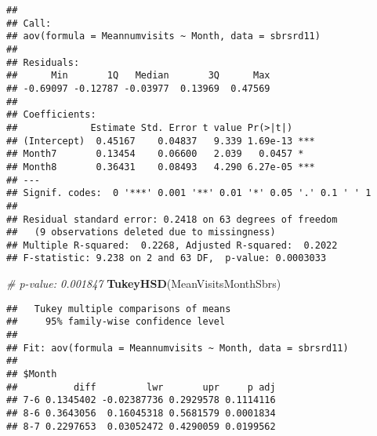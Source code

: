 \documentclass[]{article}
\newenvironment{Shaded}{\begin{snugshade}}{\end{snugshade}}
\newcommand{\CommentTok}[1]{\textcolor[rgb]{0.56,0.35,0.01}{\textit{#1}}}
\newcommand{\KeywordTok}[1]{\textcolor[rgb]{0.13,0.29,0.53}{\textbf{#1}}}
\newcommand{\NormalTok}[1]{#1}
\newcommand{\OperatorTok}[1]{\textcolor[rgb]{0.81,0.36,0.00}{\textbf{#1}}}
\newcommand{\StringTok}[1]{\textcolor[rgb]{0.31,0.60,0.02}{#1}}
\begin{document}
\begin{verbatim}
## 
## Call:
## aov(formula = Meannumvisits ~ Month, data = sbrsrd11)
## 
## Residuals:
##      Min       1Q   Median       3Q      Max 
## -0.69097 -0.12787 -0.03977  0.13969  0.47569 
## 
## Coefficients:
##             Estimate Std. Error t value Pr(>|t|)    
## (Intercept)  0.45167    0.04837   9.339 1.69e-13 ***
## Month7       0.13454    0.06600   2.039   0.0457 *  
## Month8       0.36431    0.08493   4.290 6.27e-05 ***
## ---
## Signif. codes:  0 '***' 0.001 '**' 0.01 '*' 0.05 '.' 0.1 ' ' 1
## 
## Residual standard error: 0.2418 on 63 degrees of freedom
##   (9 observations deleted due to missingness)
## Multiple R-squared:  0.2268, Adjusted R-squared:  0.2022 
## F-statistic: 9.238 on 2 and 63 DF,  p-value: 0.0003033
\end{verbatim}

\begin{Shaded}
\begin{Highlighting}[]
\CommentTok{# p-value: 0.001847}
\KeywordTok{TukeyHSD}\NormalTok{(MeanVisitsMonthSbrs)}
\end{Highlighting}
\end{Shaded}

\begin{verbatim}
##   Tukey multiple comparisons of means
##     95% family-wise confidence level
## 
## Fit: aov(formula = Meannumvisits ~ Month, data = sbrsrd11)
## 
## $Month
##          diff         lwr       upr     p adj
## 7-6 0.1345402 -0.02387736 0.2929578 0.1114116
## 8-6 0.3643056  0.16045318 0.5681579 0.0001834
## 8-7 0.2297653  0.03052472 0.4290059 0.0199562
\end{verbatim}

\begin{Shaded}
\end{Shaded}
\end{document}
